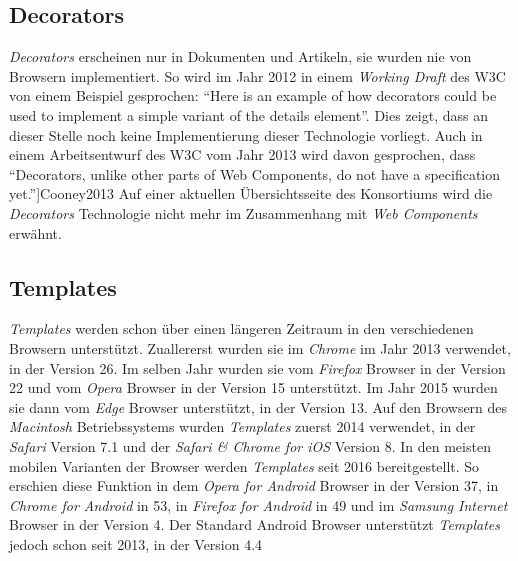 \documentclass[12pt, paper=a4, bibtotoc, toc=listof, headsepline=true]{scrreprt}
\renewcommand{\smfootcite}[2][2]{\relax}
\begin{document}
		\subsection{Decorators}
		\emph{Decorators} erscheinen nur in Dokumenten und Artikeln, sie wurden nie von Browsern implementiert. So wird im Jahr 2012 in einem \emph{Working Draft} des \ac{W3C} von einem Beispiel gesprochen: \enquote{Here is an example of how decorators could be used to implement a simple variant of the details element}.\cite{Cooney2012} Dies zeigt, dass an dieser Stelle noch keine Implementierung dieser Technologie vorliegt. Auch in einem Arbeitsentwurf des \ac{W3C} vom Jahr 2013 wird davon gesprochen, dass \enquote{Decorators, unlike other parts of Web Components, do not have a specification yet.}\smfootcite[][]{Cooney2013}
		Auf einer aktuellen Übersichtsseite des Konsortiums wird die \emph{Decorators} Technologie nicht mehr im Zusammenhang mit \emph{Web Components} erwähnt.\cite[vgl.]{WebComCur2016}
		\subsection{Templates}
		\emph{Templates} werden schon über einen längeren Zeitraum in den verschiedenen Browsern unterstützt. Zuallererst wurden sie im \emph{Chrome} im Jahr 2013 verwendet, in der Version 26. Im selben Jahr wurden sie vom \emph{Firefox} Browser in der Version 22 und vom \emph{Opera} Browser in der Version 15 unterstützt.\cite[vgl.]{W2015}\cite[vgl.]{htmlTemFire}
		Im Jahr 2015 wurden sie dann vom \emph{Edge} Browser unterstützt, in der Version 13.\cite[vgl.]{build10547}
		Auf den Browsern des \emph{Macintosh} Betriebssystems wurden \emph{Templates} zuerst 2014 verwendet, in der \emph{Safari} Version 7.1 und der \emph{Safari \& Chrome for iOS} Version 8.\cite[vgl.]{htmlTemplCaniuse} In den meisten mobilen Varianten der Browser werden \emph{Templates} seit 2016 bereitgestellt. So erschien diese Funktion in dem \emph{Opera for Android} Browser in der Version 37, in \emph{Chrome for Android} in 53, in \emph{Firefox for Android} in 49 und im \emph{Samsung Internet} Browser in der Version 4. Der Standard Android Browser unterstützt \emph{Templates} jedoch schon seit 2013, in der Version 4.4\cite[vgl.]{htmlTemplCaniuse}
\end{document}
